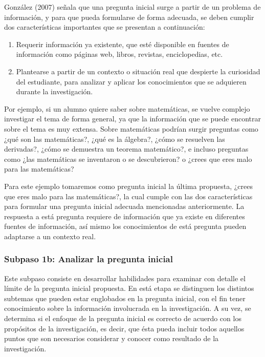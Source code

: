 González (2007) señala que una pregunta inicial surge a partir de un problema de información, y para que pueda formularse de forma adecuada, se deben cumplir dos características importantes que se presentan a continuación:

\begin{enumerate}
  \item Requerir información ya existente, que esté disponible en fuentes de información como páginas web, libros, revistas, enciclopedias, etc.
  \item Plantearse a partir de un contexto o situación real que despierte la curiosidad del estudiante, para analizar y aplicar los conocimientos que se adquieren durante la investigación.
\end{enumerate}

Por ejemplo, si un alumno quiere saber sobre matemáticas, se vuelve complejo investigar el tema de forma general, ya que la información que se puede encontrar sobre el tema es muy extensa. Sobre matemáticas podrían surgir preguntas como ¿qué son las matemáticas?, ¿qué es la álgebra?, ¿cómo se resuelven las derivadas?, ¿cómo se demuestra un teorema matemático?, e incluso preguntas como ¿las matemáticas se inventaron o se descubrieron? o ¿crees que eres malo para las matemáticas?

Para este ejemplo tomaremos como pregunta inicial la última propuesta, ¿crees que eres malo para las matemáticas?, la cual cumple con las dos características para formular una pregunta inicial adecuada mencionadas anteriormente. La respuesta a está pregunta requiere de información que ya existe en diferentes fuentes de información, así mismo los conocimientos de está pregunta pueden adaptarse a un contexto real.


\subsubsection{Subpaso 1b: Analizar la pregunta inicial}
\label{secPaso1bCap2}

Este subpaso consiste en desarrollar habilidades para examinar con detalle el límite de la pregunta inicial propuesta. En está etapa se distinguen los distintos subtemas que pueden estar  englobados en la pregunta inicial, con el fin tener conocimiento sobre la información involucrada en la investigación. A su vez, se determina si el enfoque de la pregunta inicial es correcto de acuerdo con los propósitos de la investigación, es decir, que ésta pueda incluir todos aquellos puntos que son necesarios considerar y conocer como resultado de la investigación.

